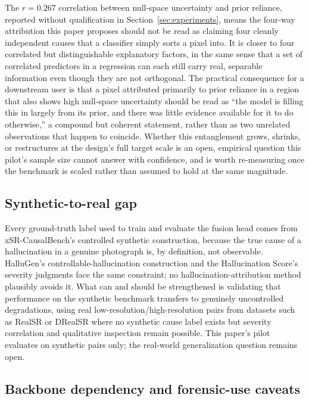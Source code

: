 \documentclass[review]{elsarticle}
\begin{document}
The $r=0.267$ correlation between null-space uncertainty and prior reliance, reported without qualification in Section~\ref{sec:experiments}, means the four-way attribution this paper proposes should not be read as claiming four cleanly independent causes that a classifier simply sorts a pixel into. It is closer to four correlated but distinguishable explanatory factors, in the same sense that a set of correlated predictors in a regression can each still carry real, separable information even though they are not orthogonal. The practical consequence for a downstream user is that a pixel attributed primarily to prior reliance in a region that also shows high null-space uncertainty should be read as ``the model is filling this in largely from its prior, and there was little evidence available for it to do otherwise,'' a compound but coherent statement, rather than as two unrelated observations that happen to coincide. Whether this entanglement grows, shrinks, or restructures at the design's full target scale is an open, empirical question this pilot's sample size cannot answer with confidence, and is worth re-measuring once the benchmark is scaled rather than assumed to hold at the same magnitude.

\subsection{Synthetic-to-real gap}

Every ground-truth label used to train and evaluate the fusion head comes from xSR-CausalBench's controlled synthetic construction, because the true cause of a hallucination in a genuine photograph is, by definition, not observable. HalluGen's controllable-hallucination construction and the Hallucination Score's severity judgments face the same constraint; no hallucination-attribution method plausibly avoids it. What can and should be strengthened is validating that performance on the synthetic benchmark transfers to genuinely uncontrolled degradations, using real low-resolution/high-resolution pairs from datasets such as RealSR or DRealSR where no synthetic cause label exists but severity correlation and qualitative inspection remain possible. This paper's pilot evaluates on synthetic pairs only; the real-world generalization question remains open.

\subsection{Backbone dependency and forensic-use caveats}
\end{document}
